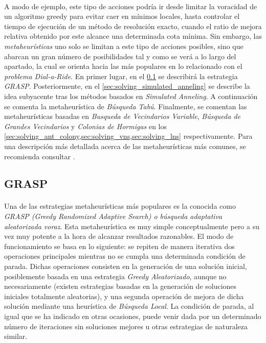 \documentclass{subfiles}
\begin{document}
      \paragraph{}
      A modo de ejemplo, este tipo de acciones podría ir desde limitar la voracidad de un algoritmo greedy para evitar caer en mínimos locales, hasta controlar el tiempo de ejecución de un método de resolución exacto, cuando el ratio de mejora relativa obtenido por este alcance una determinada cota mínima. Sin embargo, las \emph{metaheurísticas} uno solo se limitan a este tipo de acciones posibles, sino que abarcan un gran número de posibilidades tal y como se verá a lo largo del apartado, la cual se orienta hacia las más populares en lo relacionado con el \emph{problema Dial-a-Ride}. En primer lugar, en el \cref{sec:solving_grasp} se describirá la estrategia \emph{GRASP}. Posteriormente, en el \cref{sec:solving_simulated_anneling} se describe la idea subyacente tras los métodos basados en \emph{Simulated Anneling}. A continuación se comenta la metaheurística de \emph{Búsqueda Tabú}. Finalmente, se comentan las metaheurísticas basadas en \emph{Busqueda de Vecindarios Variable}, \emph{Búsqueda de Grandes Vecindarios} y \emph{Colonias de Hormigas} en los \cref{sec:solving_ant_colony,sec:solving_vns,sec:solving_lns} respectivamente. Para una descripción más detallada acerca de las metaheurísticas más comunes, se recomienda consultar \cite{boussaid2013survey}.

      \subsection{GRASP}
      \label{sec:solving_grasp}

        \paragraph{}
        Una de las estrategias metaheurísticas más populares es la conocida como \emph{GRASP (Greedy Randomized Adaptive Search) o búsqueda adaptativa aleatorizada voraz}. Esta metaheurística es muy simple conceptualmente pero a su vez muy potente a la hora de alcanzar resultados razonables. El modo de funcionamiento se basa en lo siguiente: se repiten de manera iterativa dos operaciones principales mientras no se cumpla una determinada condición de parada. Dichas operaciones consisten en la generación de una solución inicial, posiblemente basada en una estrategia \emph{Greedy Aleatorizado}, aunque no necesariamente (existen estrategias basadas en la generación de soluciones iniciales totalmente aleatorias), y una segunda operación de mejora de dicha solución mediante una heurística de \emph{Búsqueda Local}. La condición de parada, al igual que se ha indicado en otras ocasiones, puede venir dada por un determinado número de iteraciones sin soluciones mejores u otras estrategias de naturaleza similar.
\end{document}
